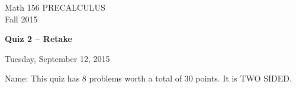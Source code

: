 \documentclass[11pt]{article}
\begin{document}
\begin{center}
\vspace{2in}

\huge{Math 156 PRECALCULUS \\
Fall 2015}

\vfill

\huge{\bf{Quiz 2 -- Retake}}\\

\vspace{0.5in}

\large{Tuesday, September 12, 2015}\\

\vfill


{\huge{Name:{\underline{\hspace{2in}}}}}
\vfill
This quiz has 8 problems worth a total of 30 points. It is TWO SIDED. 
\vfill
\end{center}
\newpage
\restoregeometry
\end{document}
